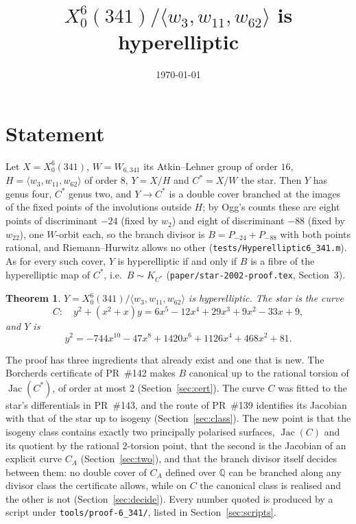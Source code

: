 \documentclass[11pt,reqno]{amsart}
\theoremstyle{plain}
\newtheorem{theorem}{Theorem}[section]
\theoremstyle{definition}
\DeclareMathOperator{\Jac}{Jac}
\newcommand{\Q}{\mathbb{Q}}
\begin{document}
\title{$X_0^6(341)/\langle w_3,w_{11},w_{62}\rangle$ is hyperelliptic}
\author{}
\date{\today}
\maketitle

\section{Statement}

Let $X=X_0^6(341)$, $W=W_{6,341}$ its Atkin--Lehner group of order $16$, $H=\langle w_3,w_{11},w_{62}\rangle$
of order $8$, $Y=X/H$ and $C^*=X/W$ the star. Then $Y$ has genus four, $C^*$ genus two, and $Y\to C^*$
is a double cover branched at the images of the fixed points of the involutions outside $H$; by
Ogg's counts these are eight points of discriminant $-24$ (fixed by $w_2$) and eight of
discriminant $-88$ (fixed by $w_{22}$), one $W$-orbit each, so the branch divisor is
$B=P_{-24}+P_{-88}$ with both points rational, and Riemann--Hurwitz allows no other
(\texttt{tests/Hyperelliptic6\_341.m}). As for every such cover, $Y$ is hyperelliptic if and only if
$B$ is a fibre of the hyperelliptic map of $C^*$, i.e.\ $B\sim K_{C^*}$ (\texttt{paper/star-2002-proof.tex},
Section~3).

\begin{theorem}\label{thm:main}
$Y=X_0^6(341)/\langle w_3,w_{11},w_{62}\rangle$ is hyperelliptic. The star is the curve
\[
  C:\quad y^2+(x^2+x)y=6x^5-12x^4+29x^3+9x^2-33x+9,
\]
and $Y$ is
\[
  y^2=-744x^{10}-47x^8+1420x^6+1126x^4+468x^2+81 .
\]
\end{theorem}

The proof has three ingredients that already exist and one that is new. The Borcherds certificate of
PR~\#142 makes $B$ canonical up to the rational torsion of $\Jac(C^*)$, of order at most $2$
(Section~\ref{sec:cert}). The curve $C$ was fitted to the star's differentials in PR~\#143, and the
route of PR~\#139 identifies its Jacobian with that of the star up to isogeny
(Section~\ref{sec:class}). The new point is that the isogeny class contains exactly two principally
polarised surfaces, $\Jac(C)$ and its quotient by the rational $2$-torsion point, that the second is
the Jacobian of an explicit curve $C_A$ (Section~\ref{sec:two}), and that the branch divisor itself
decides between them: no double cover of $C_A$ defined over $\Q$ can be branched along any divisor
class the certificate allows, while on $C$ the canonical class is realised and the other is not
(Section~\ref{sec:decide}). Every number quoted is produced by a script under
\texttt{tools/proof-6\_341/}, listed in Section~\ref{sec:scripts}.
\end{document}
